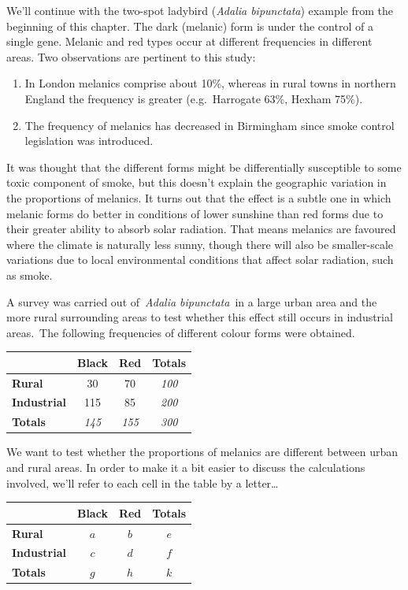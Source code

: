 \documentclass[
]{book}
\providecommand{\tightlist}{%
  \setlength{\itemsep}{0pt}\setlength{\parskip}{0pt}}
\begin{document}
We'll continue with the two-spot ladybird (\emph{Adalia bipunctata}) example from the beginning of this chapter. The dark (melanic) form is under the control of a single gene. Melanic and red types occur at different frequencies in different areas. Two observations are pertinent to this study:

\begin{enumerate}
\def\labelenumi{\arabic{enumi}.}
\tightlist
\item
  In London melanics comprise about 10\%, whereas in rural towns in northern England the frequency is greater (e.g.~Harrogate 63\%, Hexham 75\%).
\item
  The frequency of melanics has decreased in Birmingham since smoke control legislation was introduced.
\end{enumerate}

It was thought that the different forms might be differentially susceptible to some toxic component of smoke, but this doesn't explain the geographic variation in the proportions of melanics. It turns out that the effect is a subtle one in which melanic forms do better in conditions of lower sunshine than red forms due to their greater ability to absorb solar radiation. That means melanics are favoured where the climate is naturally less sunny, though there will also be smaller-scale variations due to local environmental conditions that affect solar radiation, such as smoke.

A survey was carried out of~\emph{Adalia bipunctata}~in a large urban area and the more rural surrounding areas to test whether this effect still occurs in industrial areas.~The following frequencies of different colour forms were obtained.

\begin{longtable}[]{@{}lccc@{}}
\toprule
& Black & Red & Totals \\
\midrule
\endhead
\textbf{Rural} & 30 & 70 & \emph{100} \\
\textbf{Industrial} & 115 & 85 & \emph{200} \\
\textbf{Totals} & \emph{145} & \emph{155} & \emph{300} \\
\bottomrule
\end{longtable}

We want to test whether the proportions of melanics are different between urban and rural areas. In order to make it a bit easier to discuss the calculations involved, we'll refer to each cell in the table by a letter\ldots{}

\begin{longtable}[]{@{}lccc@{}}
\toprule
& Black & Red & Totals \\
\midrule
\endhead
\textbf{Rural} & \(a\) & \(b\) & \(e\) \\
\textbf{Industrial} & \(c\) & \(d\) & \(f\) \\
\textbf{Totals} & \(g\) & \(h\) & \(k\) \\
\bottomrule
\end{longtable}
\end{document}
